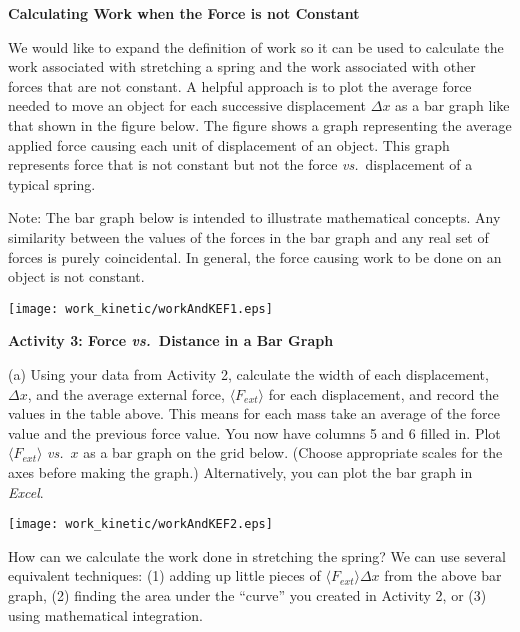 \bigskip
\textbf{Calculating Work when the Force is not Constant }

We would like to expand the definition of work so it can be used to calculate
the work associated with stretching a spring and the work associated with other
forces that are not constant. A helpful approach is to plot the average force
needed to move an object for each successive displacement \( \Delta  x\) as
a bar graph like that shown in the figure below. The figure shows a graph representing
the average applied force causing each unit of displacement of an object. This
graph represents force that is not constant but not the force \textit{vs.}~displacement
of a typical spring.

Note: The bar graph below is intended to illustrate mathematical concepts. Any
similarity between the values of the forces in the bar graph and any real set
of forces is purely coincidental. In general, the force causing work to be done
on an object is not constant.

\vspace{0.3cm}
{\par\centering \texttt{[image: work\_kinetic/workAndKEF1.eps]} \par}
\vspace{0.3cm}

\textbf{Activity 3: Force \textit{vs.}~Distance in a Bar Graph }

(a) Using your data from Activity 2, calculate the width of each displacement, \( \Delta x \), and the average external force, \(\langle F_{ext} \rangle\) for each displacement, and record the values in the table above. This means for each mass take an average of the force value and the previous force value. You now have columns 5 and 6 filled in. Plot \( \langle F_{ext} \rangle\) \textit{vs.}~$x$ as a bar graph on the grid below.  (Choose appropriate scales for the axes before making the graph.) Alternatively, you can plot the bar graph in \textit{Excel}.

\vspace{0.3cm}
{\par\centering \texttt{[image: work\_kinetic/workAndKEF2.eps]} \par}
\vspace{0.3cm}

How can we calculate the work done in stretching the spring? We can use several
equivalent techniques: (1) adding up little pieces of \( \langle F_{ext} 
\rangle \Delta x \) from the above bar graph,
(2) finding the area under the ``curve'' you created in Activity 2, or (3)
using mathematical integration.

